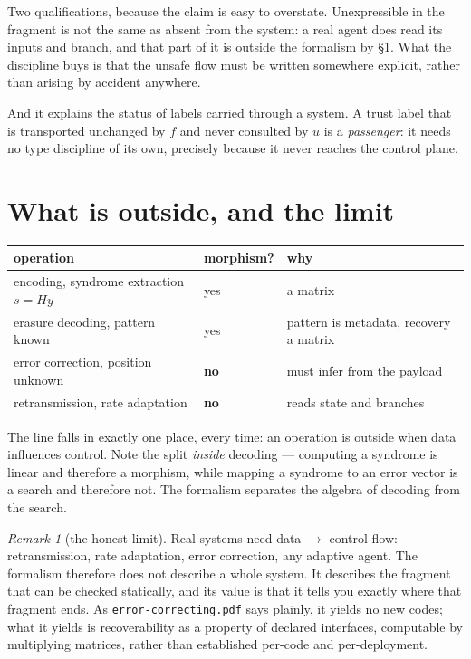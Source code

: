 \documentclass[11pt,a4paper]{article}
\theoremstyle{definition}
\theoremstyle{remark}
\newtheorem{remark}[theorem]{Remark}
\begin{document}
Two qualifications, because the claim is easy to overstate. Unexpressible in the
fragment is not the same as absent from the system: a real agent does read its
inputs and branch, and that part of it is outside the formalism by
\S\ref{sec:outside}. What the discipline buys is that the unsafe flow must be
written somewhere explicit, rather than arising by accident anywhere.

And it explains the status of labels carried through a system. A trust label that
is transported unchanged by $f$ and never consulted by $u$ is a
\emph{passenger}: it needs no type discipline of its own, precisely because it
never reaches the control plane.

\section{What is outside, and the limit}\label{sec:outside}

\begin{center}
\small
\begin{tabular}{lll}
\toprule
operation & morphism? & why \\
\midrule
encoding, syndrome extraction $s = Hy$ & yes & a matrix \\
erasure decoding, pattern known & yes & pattern is metadata, recovery a matrix \\
error correction, position unknown & \textbf{no} & must infer from the payload \\
retransmission, rate adaptation & \textbf{no} & reads state and branches \\
\bottomrule
\end{tabular}
\end{center}

The line falls in exactly one place, every time: an operation is outside when data
influences control. Note the split \emph{inside} decoding --- computing a syndrome
is linear and therefore a morphism, while mapping a syndrome to an error vector is
a search and therefore not. The formalism separates the algebra of decoding from
the search.

\begin{remark}[the honest limit]
Real systems need data $\to$ control flow: retransmission, rate adaptation, error
correction, any adaptive agent. The formalism therefore does not describe a whole
system. It describes the fragment that can be checked statically, and its value is
that it tells you exactly where that fragment ends. As
\texttt{error-correcting.pdf} says plainly, it yields no new codes; what it yields
is recoverability as a property of declared interfaces, computable by multiplying
matrices, rather than established per-code and per-deployment.
\end{remark}
\end{document}
